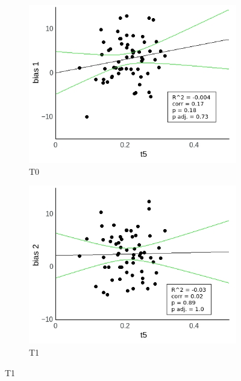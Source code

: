 \documentclass[a4paper]{scrreprt}
\begin{document}
\begin{figure}
\centering
\begin{subfigure}[b]{0.49\textwidth}
        \includegraphics[width=\textwidth]{figs/sec3/t5/t5no_diff_1_mod2mod2.jpeg}
        \caption{T0}
    \end{subfigure}
    \begin{subfigure}[b]{0.49\textwidth}
        \includegraphics[width=\textwidth]{figs/sec3/t5/t5no_diff_2_mod2mod2.jpeg}
        \caption{T1}
    \end{subfigure}


\end{figure}
\end{document}
